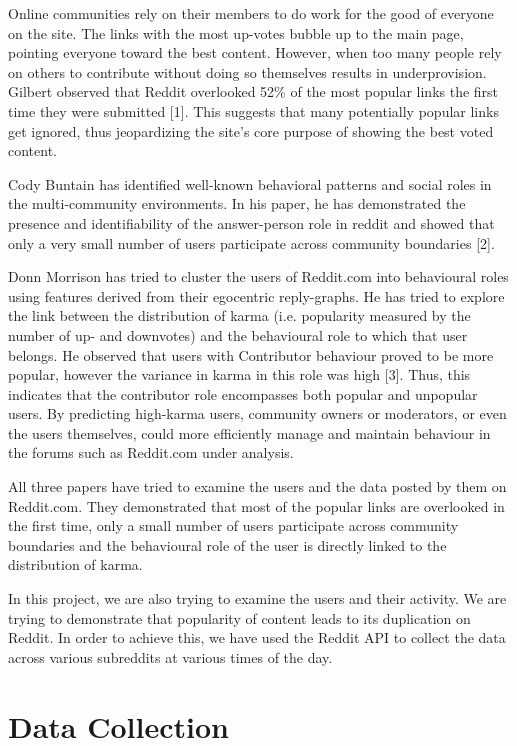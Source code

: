 \documentclass{article} %
\begin{document}
Online communities rely on their members to do work for the good of everyone on the site. The links with the most up-votes bubble up to the main page, pointing everyone toward the best content. However, when too many people rely on others to contribute without doing so themselves results in underprovision. Gilbert observed that Reddit overlooked 52\% of the most popular links the first time they were submitted [1]. This suggests that many potentially popular links get ignored, thus jeopardizing the site's core purpose of showing the best voted content. 

Cody Buntain has identified well-known behavioral patterns and social roles in the multi-community environments. In his paper, he has demonstrated the presence and identifiability of the answer-person role in reddit and showed that only a very small number of users participate across community boundaries [2]. 
				
Donn Morrison has tried to cluster the users of Reddit.com into behavioural roles using features derived from their egocentric reply-graphs. He has tried to explore the link between the distribution of karma (i.e. popularity measured by the number of up- and downvotes) and the behavioural role to which that user belongs. He observed that users with Contributor behaviour proved to be more popular, however the variance in karma in this role was high [3]. Thus, this indicates that the contributor role encompasses both popular and unpopular users. By predicting high-karma users, community owners or moderators, or even the users themselves, could more efficiently manage and maintain behaviour in the forums such as Reddit.com under analysis.	

All three papers have tried to examine the users and the data posted by them on Reddit.com. They demonstrated that most of the popular links are overlooked in the first time, only a small number of users participate across community boundaries and the behavioural role of the user is directly linked to the distribution of karma. 

In this project, we are also trying to examine the users and their activity. We are trying to demonstrate that popularity of content leads to its duplication on Reddit. In order to achieve this, we have used the Reddit API to collect the data across various subreddits at various times of the day. 


\section{Data Collection}
\end{document}
